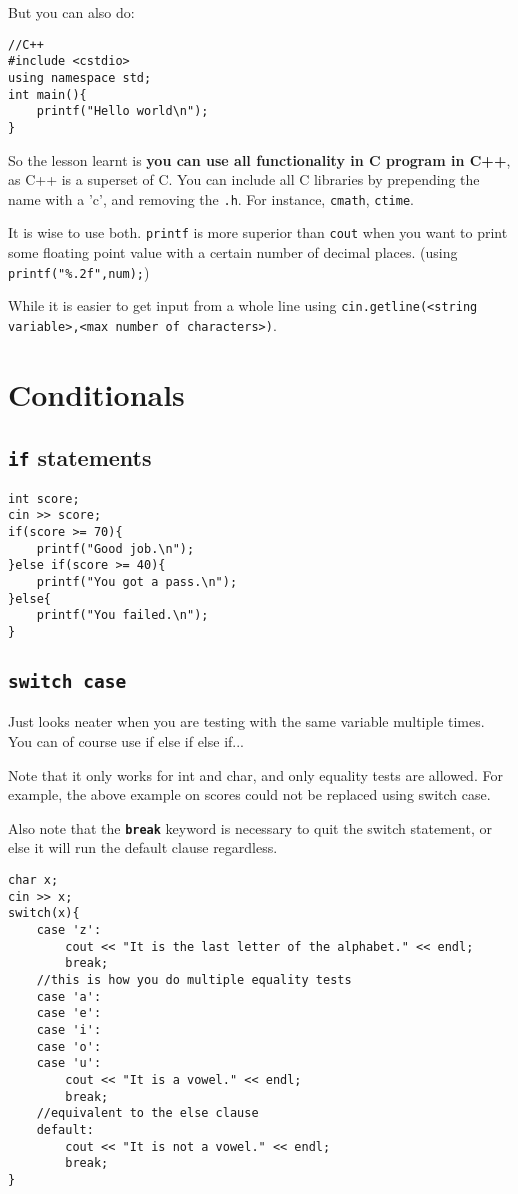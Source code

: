 But you can also do:

\begin{lstlisting}
//C++
#include <cstdio>
using namespace std;
int main(){
    printf("Hello world\n");
}
\end{lstlisting}

So the lesson learnt is \textbf{you can use all functionality in C program in C++}, as C++ is a superset of C. You can include all C libraries by prepending the name with a 'c', and removing the \texttt{.h}. For instance, \texttt{cmath}, \texttt{ctime}.
\vspace{6mm}

It is wise to use both. \texttt{printf} is more superior than \texttt{cout} when you want to print some floating point value with a certain number of decimal places. (using \texttt{printf("\%.2f",num);})

While it is easier to get input from a whole line using \texttt{cin.getline(<string variable>,<max number of characters>)}.

\section{Conditionals}
\subsection{\texttt{if} statements}

\begin{lstlisting}
int score;
cin >> score;
if(score >= 70){
    printf("Good job.\n");
}else if(score >= 40){
    printf("You got a pass.\n");
}else{
    printf("You failed.\n");
}
\end{lstlisting}

\subsection{\texttt{switch case}}

Just looks neater when you are testing with the same variable multiple times. You can of course use if else if else if... 

Note that it only works for int and char, and only equality tests are allowed. For example, the above example on scores could not be replaced using switch case.

Also note that the \textbf{\texttt{break}} keyword is necessary to quit the switch statement, or else it will run the default clause regardless.

\begin{lstlisting}
char x;
cin >> x;
switch(x){
    case 'z':
        cout << "It is the last letter of the alphabet." << endl;
        break;
    //this is how you do multiple equality tests
    case 'a':
    case 'e':
    case 'i':
    case 'o':
    case 'u':
        cout << "It is a vowel." << endl;
        break;
    //equivalent to the else clause
    default:
        cout << "It is not a vowel." << endl;
        break;
}
\end{lstlisting}

